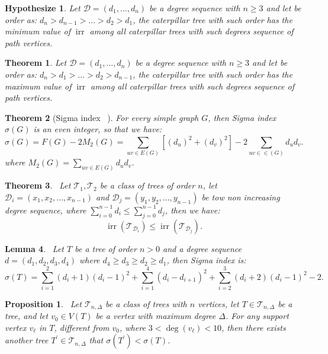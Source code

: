 \documentclass[12pt]{amsart}
\newcommand{\irr}{\operatorname{irr}}
\newtheorem{hypothesize}{Hypothesize}
\newtheorem{theorem}{Theorem}[section]
\newtheorem{lemma}[theorem]{Lemma}
\newtheorem{proposition}{Proposition}[section]
\begin{document}
\begin{hypothesize}{\label{hy.2}}
Let $\mathscr{D}=(d_1,\dots,d_n)$ be a degree sequence with $n\geq 3$ and  let be order as: ${d_n} > d_{n-1}> \dots> d_2>  d_1$, the caterpillar tree with such order has the  minimum  value  of $\irr$ among all caterpillar trees with such degrees sequence of path vertices.
\end{hypothesize}
\begin{theorem}{\label{hy.1}}
Let $\mathscr{D}=(d_1,\dots,d_n)$ be a degree sequence with $n\geq 3$ and  let be order as: $d_n > d_1>\dots > d_2 > d_{n-1}$, the caterpillar tree with such order has the  maximum value  of $\irr$ among all caterpillar trees with such degrees sequence of path vertices.
 \end{theorem}
 \begin{theorem}[Sigma index ~\label{sigmathm}]\cite{GutmanTogan}
For every simple graph $G$, then Sigma index $\sigma(G)$ is an even integer, so that we have:
\[
\sigma(G)=F(G)-2 M_2(G)=\sum_{uv\in E(G)}\left[\left(d_u\right)^2+\left(d_v\right)^2\right]-2 \sum_{uv \in \in(G)} d_u d_v .
\]
where $M_2(G)=\sum_{uv\in E(G)} d_ud_v$.
\end{theorem}
\begin{theorem}~\label{pro.se.1}
Let $\mathcal{T}_1,\mathcal{T}_2$ be a class of trees of order $n$, let $\mathscr{D}_i=(x_1,x_2,\dots, x_{n-1})$ and $\mathscr{D}_j=(y_1,y_2,\dots, y_{n-1})$ be tow non increasing degree sequence, where $\sum_{i=0}^{n-1}d_i\leqslant \sum_{j=0}^{n-1}d_j$, then we have: 
\[
\irr(\mathcal{T}_{\mathscr{D}_i})\leqslant \irr(\mathcal{T}_{\mathscr{D}_j}).
\]
\end{theorem}
\begin{lemma}~\label{le.sigma2}
Let $T$ be a tree of order $n>0$ and a degree sequence $d=(d_1,d_2,d_3,d_4)$ where $d_4\geqslant d_3\geqslant d_2\geqslant d_1$, then Sigma index is: 
\[
\sigma(T)=\sum_{i=1}^{2} (d_i+1)(d_i-1)^2+\sum_{i=1}^{4}(d_i-d_{i+1})^2+\sum_{i=2}^{3}(d_i+2)(d_i-1)^2-2.
\]
\end{lemma}
\begin{proposition}~\label{classoftreessigma}
Let $\mathcal{T}_{n, \Delta}$ be a class of trees with $n$ vertices, let $T \in \mathcal{T}_{n, \Delta}$ be a tree, and let $v_0 \in V(T)$ be a vertex with maximum degree $\Delta$. For any support vertex $v_{\ell}$ in $T$, different from $v_0$, where $3<\deg(v_{\ell})<10$, then there exists another tree $T^{\prime} \in \mathcal{T}_{n, \Delta}$  that $\sigma(T^{\prime}) < \sigma(T)$.
\end{proposition}
\end{document}
